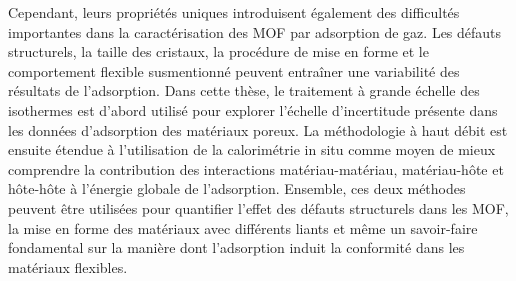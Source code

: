 Cependant, leurs propriétés uniques introduisent également des difficultés 
importantes dans la caractérisation des MOF par adsorption de gaz. Les 
défauts structurels, la taille des cristaux, la procédure de mise en forme 
et le comportement flexible susmentionné peuvent entraîner une variabilité 
des résultats de l'adsorption. Dans cette thèse, le traitement à grande 
échelle des isothermes est d'abord utilisé pour explorer l'échelle 
d'incertitude présente dans les données d'adsorption des matériaux poreux. 
La méthodologie à haut débit est ensuite étendue à l’utilisation de la 
calorimétrie in situ comme moyen de mieux comprendre la contribution des 
interactions matériau-matériau, matériau-hôte et hôte-hôte à l’énergie 
globale de l’adsorption. Ensemble, ces deux méthodes peuvent être utilisées 
pour quantifier l'effet des défauts structurels dans les MOF, la mise en 
forme des matériaux avec différents liants et même un savoir-faire 
fondamental sur la manière dont l'adsorption induit la conformité dans les 
matériaux flexibles.
